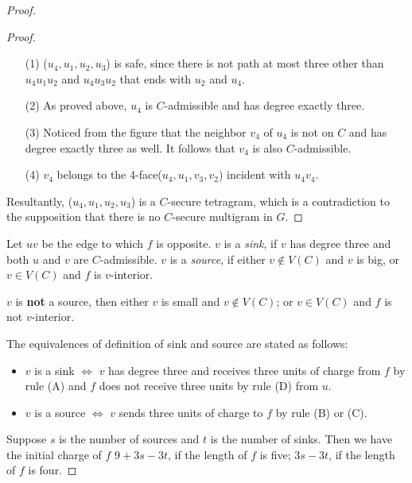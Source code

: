 \begin{proof}
\begin{proof}
\begin{itemize}
    \item[(1)] ($u_4, u_1, u_2, u_3$) is safe, since there is not path at most three other than $u_4u_1u_2$ and $u_4u_3u_2$ that ends with $u_2$ and $u_4$. 
    \item[(2)] As proved above, $u_4$ is $C$-admissible and has degree exactly three.
    \item[(3)] Noticed from the figure that the neighbor $v_4$ of $u_4$ is not on $C$ and has degree exactly three as well. It follows that $v_4$ is also $C$-admissible.
    \item[(4)] $v_4$ belongs to the 4-face($u_4, u_1, v_3, v_2$) incident with $u_4v_4$. 
\end{itemize}
Resultantly, ($u_4, u_1, u_2, u_3$) is a $C$-secure tetragram, which is a contradiction to the supposition that there is no $C$-secure multigram in $G$.
\end{proof}

\begin{definition}
Let $uv$ be the edge to which $f$ is opposite. $v$ is a \textit{sink}, if $v$ has degree three and both $u$ and $v$ are $C$-admissible. $v$ is a \textit{source}, if either $v \notin V(C)$ and $v$ is big, or $v \in V(C)$ and $f$ is $v$-interior. \cite{dvorak2013threecoloring}
\end{definition}

\begin{observation}
$v$ is \textbf{not} a source, then either $v$ is small and $v \notin V(C)$; or $v \in V(C)$ and $f$ is not $v$-interior.
\end{observation}

\begin{observation}
The equivalences of definition of sink and source are stated as follows: \cite{dvorak2013threecoloring}
\begin{itemize}
    \item $v$ is a sink $\Longleftrightarrow$ $v$ has degree three and receives three units of charge from $f$ by rule (A) and $f$ does not receive three units by rule (D) from $u$.
    \item $v$ is a source $\Longleftrightarrow$ $v$ sends three units of charge to $f$ by rule (B) or (C).
\end{itemize}
\end{observation}
Suppose $s$ is the number of sources and $t$ is the number of sinks. Then we have the initial charge of $f$ $9 + 3s - 3t$, if the length of $f$ is five; $3s - 3t$, if the length of $f$ is four. 


\end{proof}
